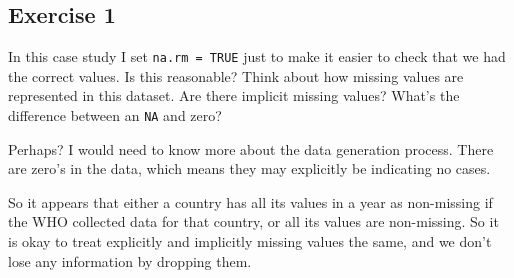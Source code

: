 \documentclass[]{book}
\newenvironment{Shaded}{\begin{snugshade}}{\end{snugshade}}
\newcommand{\CommentTok}[1]{\textcolor[rgb]{0.56,0.35,0.01}{\textit{#1}}}
\newcommand{\DataTypeTok}[1]{\textcolor[rgb]{0.13,0.29,0.53}{#1}}
\newcommand{\DecValTok}[1]{\textcolor[rgb]{0.00,0.00,0.81}{#1}}
\newcommand{\KeywordTok}[1]{\textcolor[rgb]{0.13,0.29,0.53}{\textbf{#1}}}
\newcommand{\NormalTok}[1]{#1}
\newcommand{\OperatorTok}[1]{\textcolor[rgb]{0.81,0.36,0.00}{\textbf{#1}}}
\newcommand{\StringTok}[1]{\textcolor[rgb]{0.31,0.60,0.02}{#1}}
\theoremstyle{plain}
\theoremstyle{remark}
\theoremstyle{definition}
\theoremstyle{definition}
\theoremstyle{definition}
\theoremstyle{remark}
\begin{document}
\hypertarget{exercise-1-25}{%
\subsection{Exercise 1}\label{exercise-1-25}}

In this case study I set \texttt{na.rm\ =\ TRUE} just to make it easier
to check that we had the correct values. Is this reasonable? Think about
how missing values are represented in this dataset. Are there implicit
missing values? What's the difference between an \texttt{NA} and zero?

Perhaps? I would need to know more about the data generation process.
There are zero's in the data, which means they may explicitly be
indicating no cases.

\begin{Shaded}
\end{Shaded}

So it appears that either a country has all its values in a year as
non-missing if the WHO collected data for that country, or all its
values are non-missing. So it is okay to treat explicitly and implicitly
missing values the same, and we don't lose any information by dropping
them.

\begin{Shaded}
\end{Shaded}
\end{document}
